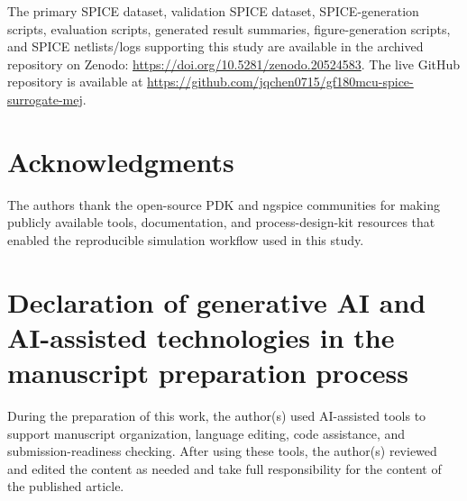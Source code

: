\documentclass[preprint,12pt]{elsarticle}
\begin{document}
The primary SPICE dataset, validation SPICE dataset, SPICE-generation scripts, evaluation scripts, generated result summaries, figure-generation scripts, and SPICE netlists/logs supporting this study are available in the archived repository on Zenodo: \url{https://doi.org/10.5281/zenodo.20524583}. The live GitHub repository is available at \url{https://github.com/jqchen0715/gf180mcu-spice-surrogate-mej}.

\section*{Acknowledgments}

The authors thank the open-source PDK and ngspice communities for making publicly available tools, documentation, and process-design-kit resources that enabled the reproducible simulation workflow used in this study.

\section*{Declaration of generative AI and AI-assisted technologies in the manuscript preparation process}

During the preparation of this work, the author(s) used AI-assisted tools to support manuscript organization, language editing, code assistance, and submission-readiness checking. After using these tools, the author(s) reviewed and edited the content as needed and take full responsibility for the content of the published article.



\end{document}
